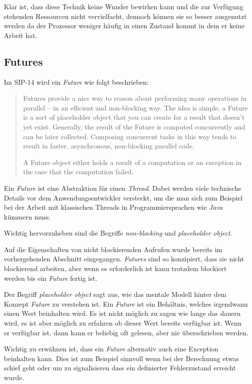 Klar ist, dass diese Technik keine Wunder bewirken kann und die zur
Verfügung stehenden Ressourcen nicht vervielfacht, dennoch können
sie so besser ausgenutzt werden da der Prozessor weniger häufig
in einen Zustand kommt in dem er keine Arbeit hat.

\subsection{Futures}

Im SIP-14 wird ein \emph{Future} wie folgt beschrieben:
\begin{quote}
Futures provide a nice way to reason about performing many operations in 
parallel – in an efficient and non-blocking way. The idea is simple, a Future 
is a sort of placeholder object that you can create for a result that doesn’t 
yet exist. Generally, the result of the Future is computed concurrently and can 
be later collected. Composing concurrent tasks in this way tends to result in 
faster, asynchronous, non-blocking parallel code.

A Future object either holds a result of a computation or an 
exception in the case that the computation failed.
\end{quote}

Ein \emph{Future} ist eine Abstraktion für einen \emph{Thread}.
Dabei werden viele technische Details vor dem Anwendungsentwickler
versteckt, um die man sich zum Beispiel bei der Arbeit mit klassischen
Threads in Programmiersprachen wie \emph{Java} kümmern muss.

Wichtig hervorzuheben sind die Begriffe \emph{non-blocking} und
\emph{placeholder object}.

Auf die Eigenschaften von nicht blockierenden Aufrufen wurde bereits
im vorhergehenden Abschnitt eingegangen. \emph{Futures} sind so konzipiert,
dass sie nicht blockierend arbeiten, aber wenn es erforderlich ist
kann trotzdem blockiert werden bis ein \emph{Future} fertig ist.

Der Begriff \emph{placeholder object} sagt aus, wie das mentale
Modell hinter dem Konzept \emph{Future} zu verstehen ist. Ein
\emph{Future} ist ein Behältnis, welches irgendwann einen Wert
beinhalten wird. Es ist nicht möglich zu sagen wie lange das dauern
wird, es ist aber möglich zu erfahren ob dieser Wert bereits
verfügbar ist. Wenn er verfügbar ist, dann kann er beliebig oft
gelesen, aber nie überschrieben werden.

Wichtig zu erwähnen ist, dass ein \emph{Future} alternativ
auch eine Exception beinhalten kann. Dies ist zum Beispiel sinnvoll
wenn bei der Berechnung etwas schief geht oder um zu signalisieren
dass ein definierter Fehlerzustand erreicht wurde.

